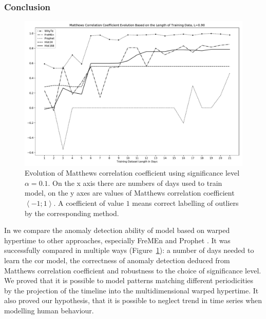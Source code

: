 \subsubsection{Conclusion}
\begin{figure}[t!]
\begin{center}
    \includegraphics[width=1.0\columnwidth]{fig/mathew_graph_90}
    \caption{Evolution of Matthews correlation coefficient using significance level $\alpha=0.1$. On the x axis there are numbers of days used to train model, on the y axes are values of Matthews correlation coefficient $\left<-1;1\right>$. A coefficient of value $1$ means correct labelling of outliers by the corresponding method.   \label{graph:mathew90}}

\end{center}
\end{figure}

In \cite{Vintr2018Spatiotemporal} we compare the anomaly detection ability of model based on warped hypertime to other approaches, especially FreMEn \cite{krajnik2017fremen} and Prophet \cite{taylor2018forecasting}. 
It was successfully compared in multiple ways (Figure~\ref{graph:mathew90}): a number of days needed to learn the cor model, the correctness of anomaly detection deduced from Matthews correlation coefficient \cite{matthews1975comparison} and robustness to the choice of significance level.
We proved that it is possible to model patterns matching different periodicities by the projection of the timeline into the multidimensional warped hypertime.
It also proved our hypothesis, that it is possible to neglect trend in time series when modelling human behaviour.





